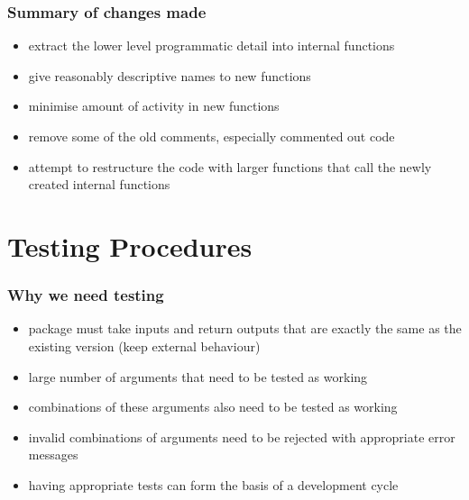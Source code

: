 \documentclass{beamer}
\begin{document}
\begin{frame}
	\frametitle{Summary of changes made}
	 \begin{itemize}
		 \item extract the lower level programmatic detail into internal functions\\
		 \item give reasonably descriptive names to new functions\\
		 \item minimise amount of activity in new functions\\
		 \item remove some of the old comments, especially commented out code\\
		 \item attempt to restructure the code with larger functions that call the newly created internal functions\\
	 \end{itemize}
\end{frame}

\section{Testing Procedures}

\begin{frame}
  \frametitle{Why we need testing}
  
  \begin{itemize}
    \item package must take inputs and return outputs that are exactly the same as the existing version (keep external behaviour)\\
    \item large number of arguments that need to be tested as working\\
    \item combinations of these arguments also need to be tested as working\\
    \item invalid combinations of arguments need to be rejected with appropriate error messages\\
    \item having appropriate tests can form the basis of a development cycle\\
  \end{itemize}
\end{frame}
\end{document}
